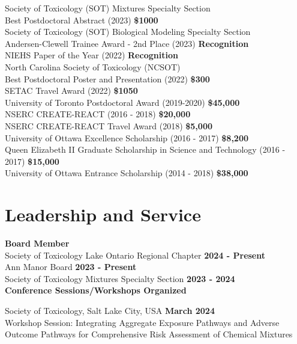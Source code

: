 \documentclass[margin,line]{res}
\newcommand\tab[1][1cm]{\hspace*{#1}}
\begin{document}
\begin{resume}
Society of Toxicology (SOT) Mixtures Specialty Section\\
\tab Best Postdoctoral Abstract (2023)
\hfill {\textbf{\$1000}}\\
Society of Toxicology (SOT) Biological Modeling Specialty Section\\
\tab Andersen-Clewell Trainee Award - 2nd Place (2023)
\hfill {\textbf{Recognition}}\\
NIEHS Paper of the Year (2022)
\hfill {\textbf{Recognition}}\\
North Carolina Society of Toxicology (NCSOT)\\
\tab Best Postdoctoral Poster and Presentation (2022)
\hfill {\textbf{\$300}}\\
SETAC Travel Award (2022)
\hfill {\textbf{\$1050}}\\
University of Toronto Postdoctoral Award (2019-2020)
\hfill {\textbf{\$45,000}}\\
NSERC CREATE-REACT (2016 - 2018)
\hfill {\textbf{\$20,000}}\\
NSERC CREATE-REACT Travel Award (2018)
\hfill {\textbf{\$5,000}}\\
University of Ottawa Excellence Scholarship (2016 - 2017)
\hfill {\textbf{\$8,200}}\\
Queen Elizabeth II Graduate Scholarship in Science and Technology (2016 - 2017)
\hfill {\textbf{\$15,000}}\\
University of Ottawa Entrance Scholarship (2014 - 2018)
\hfill {\textbf{\$38,000}}\\

\vspace*{.1in}

\section{\sc Leadership and Service}
{\bf Board Member}\\
{Society of Toxicology Lake Ontario Regional Chapter} \hfill {\bf 2024 - Present}\\
{Ann Manor Board} \hfill {\bf 2023 - Present}\\
{Society of Toxicology Mixtures Specialty Section} \hfill {\bf 2023 - 2024}\\

{\bf Conference Sessions/Workshops Organized}

Society of Toxicology, Salt Lake City, USA \hfill {\bf  March 2024}\\
Workshop Session: Integrating Aggregate Exposure Pathways and Adverse Outcome Pathways for Comprehensive Risk Assessment of Chemical Mixtures


\end{resume}
\end{document}
